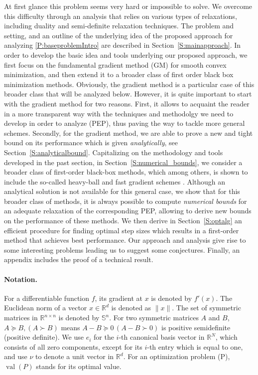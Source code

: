 \documentclass[12pt]{article}
\numberwithin{equation}{section}
\theoremstyle{definition}
\theoremstyle{remark}
\DeclareMathOperator{\val}{val}
\def\real{\mathbb{R}}
\begin{document}
At first glance this problem seems very hard or impossible to solve.  We overcome this
difficulty through an analysis that relies on various types of relaxations, including duality
and semi-definite relaxation techniques.
The problem and setting, and an outline of the
underlying idea of the proposed approach for analyzing \eqref{P:baseproblemIntro} are described in Section~\ref{S:mainapproach}.
In order to develop the basic idea and tools underlying our proposed approach, we first focus on the
fundamental gradient method (GM) for smooth convex minimization, and then extend it to a broader class of first order black
box minimization methods.  Obviously, the gradient method is a particular case of this broader class that will be analyzed below.
However,  it is quite important to start with the gradient method for two reasons. First, it allows to acquaint the reader
in a more transparent way with the techniques and methodolgy we need to develop  in order to analyze (PEP),  thus
paving the way to tackle more general schemes. Secondly, for the gradient method,
we are able to prove a new and tight bound on its performance which is given {\em analytically}, see Section~\ref{S:analyticalbound}.
Capitalizing on the methodology and tools developed in the past section,  in Section~\ref{S:numerical_bounds}, we  consider a broader
class of first-order black-box methods, which among others, is shown to include the so-called
heavy-ball  \cite{polyak1964} and fast gradient schemes  \cite {nest-book-04}. Although an
analytical solution is not available for this general case, we show that for this broader
class of methods, it is always possible to compute {\em numerical bounds} for an adequate
relaxation of the corresponding PEP,  allowing to derive new  bounds on the performance of
these methods.  We then derive in Section~\ref{S:optalg} an efficient procedure for finding
optimal step sizes which results in a first-order method that achieves best performance. Our
approach and analysis give rise to some interesting problems leading us to suggest some
conjectures.  Finally, an appendix includes the proof of a technical result.

\paragraph{Notation.} For a differentiable function $f$, its gradient at $x$ is denoted by
$f'(x)$. The Euclidean norm of a vector $x\in\real^d$ is denoted as $\|x\|$.
The set of symmetric matrices in $\real^{n\times n}$ is denoted by $\mathbb{S}^n$.
For two symmetric
matrices $A$ and $B$, $A\succeq B, (A \succ B)$ means $A-B \succeq 0 \,(A-B \succ 0)$ is
positive semidefinite (positive definite).
We use $e_i$ for the $i$-th canonical basis vector in $\mathbb{R}^N$, which consists of all zero components,
except for its $i$-th entry which is equal to one,
and use $\nu$ to denote a unit vector in $\mathbb{R}^d$. For an optimization problem (P), $\val(P)$
stands for its optimal value.
\end{document}
